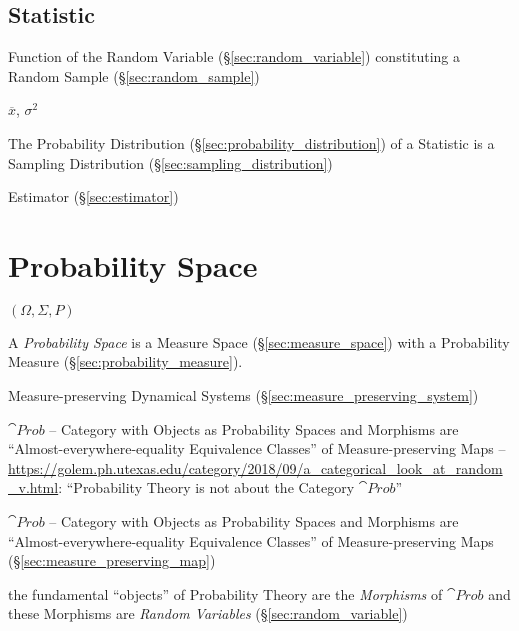 \subsection{Statistic}\label{sec:statistic}

Function of the Random Variable (\S\ref{sec:random_variable})
constituting a Random Sample (\S\ref{sec:random_sample})

$\overline{x}$, $\sigma^2$

The Probability Distribution (\S\ref{sec:probability_distribution}) of
a Statistic is a Sampling Distribution
(\S\ref{sec:sampling_distribution})

Estimator (\S\ref{sec:estimator})



\section{Probability Space}\label{sec:probability_space}

$(\Omega, \Sigma, P)$

A \emph{Probability Space} is a Measure Space
(\S\ref{sec:measure_space}) with a Probability Measure
(\S\ref{sec:probability_measure}).

\fist Measure-preserving Dynamical Systems
(\S\ref{sec:measure_preserving_system})

$\cat{Prob}$ -- Category with Objects as Probability Spaces and Morphisms are
``Almost-everywhere-equality Equivalence Classes'' of Measure-preserving Maps
--
\url{https://golem.ph.utexas.edu/category/2018/09/a_categorical_look_at_random_v.html}:
``Probability Theory is not about the Category $\cat{Prob}$''

$\cat{Prob}$ -- Category with Objects as Probability Spaces and Morphisms are
``Almost-everywhere-equality Equivalence Classes'' of Measure-preserving Maps
(\S\ref{sec:measure_preserving_map})

the fundamental ``objects'' of Probability Theory are the \emph{Morphisms} of
$\cat{Prob}$ and these Morphisms are \emph{Random Variables}
(\S\ref{sec:random_variable})



